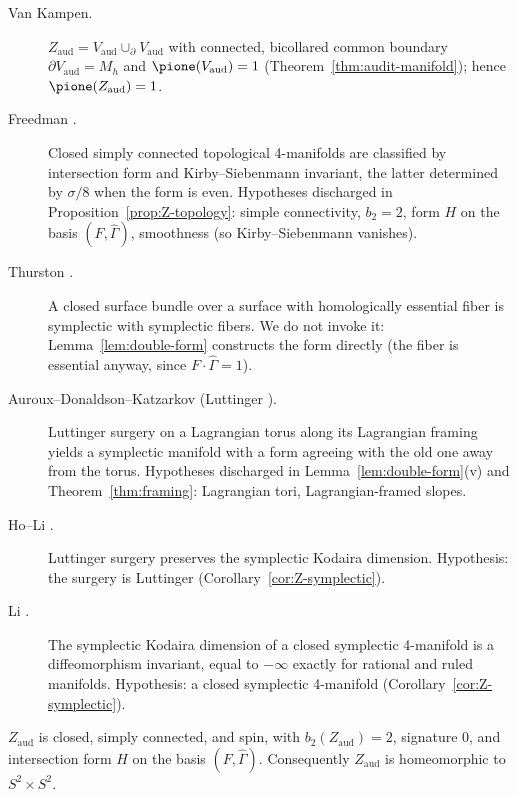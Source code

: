 \begin{description}
\item[Van Kampen.] $Z_{\mathrm{aud}}=V_{\mathrm{aud}}\cup_{\partial}V_{\mathrm{aud}}$
 with connected, bicollared common boundary $\partial V_{\mathrm{aud}}=M_h$
 and $\pione(V_{\mathrm{aud}})=1$ (Theorem~\ref{thm:audit-manifold});
 hence $\pione(Z_{\mathrm{aud}})=1$.
\item[Freedman \cite{Freedman}.] Closed simply connected topological
 4-manifolds are classified by intersection form and Kirby--Siebenmann
 invariant, the latter determined by $\sigma/8$ when the form is even.
 Hypotheses discharged in Proposition~\ref{prop:Z-topology}: simple
 connectivity, $b_2=2$, form $H$ on the basis $(F,\hat\Gamma)$,
 smoothness (so Kirby--Siebenmann vanishes).
\item[Thurston \cite{Thurston}.] A closed surface bundle over a surface with
 homologically essential fiber is symplectic with symplectic fibers.  We do
 not invoke it: Lemma~\ref{lem:double-form} constructs the form directly
 (the fiber is essential anyway, since $F\cdot\hat\Gamma=1$).
\item[Auroux--Donaldson--Katzarkov \cite{ADK} (Luttinger \cite{Luttinger}).]
 Luttinger surgery on a Lagrangian torus along its Lagrangian framing yields
 a symplectic manifold with a form agreeing with the old one away from the
 torus.  Hypotheses discharged in Lemma~\ref{lem:double-form}(v) and
 Theorem~\ref{thm:framing}: Lagrangian tori, Lagrangian-framed slopes.
\item[Ho--Li \cite{HoLi}.] Luttinger surgery preserves the symplectic
 Kodaira dimension.  Hypothesis: the surgery is Luttinger
 (Corollary~\ref{cor:Z-symplectic}).
\item[Li \cite{Li}.] The symplectic Kodaira dimension of a closed
 symplectic 4-manifold is a diffeomorphism invariant, equal to $-\infty$
 exactly for rational and ruled manifolds.  Hypothesis: a closed symplectic
 4-manifold (Corollary~\ref{cor:Z-symplectic}).
\end{description}

\begin{proposition}\label{prop:Z-topology}
$Z_{\mathrm{aud}}$ is closed, simply connected, and spin, with
$b_2(Z_{\mathrm{aud}})=2$, signature $0$, and intersection form $H$ on the
basis $(F,\hat\Gamma)$.  Consequently $Z_{\mathrm{aud}}$ is homeomorphic to
$S^2\times S^2$.
\end{proposition}

